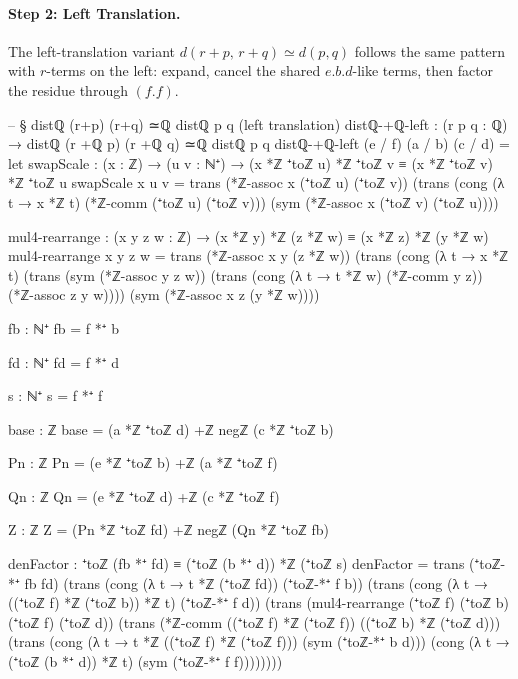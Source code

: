 \documentclass[11pt,a4paper]{book}
\def\cdot{.}%
\begin{document}
\paragraph{Step 2: Left Translation.}
The left-translation variant $d(r+p,\,r+q) \simeq d(p,q)$
follows the same pattern with $r$-terms on the left:
expand, cancel the shared $e \cdot b \cdot d$-like terms, then
factor the residue through $(f \cdot f)$.

\begin{code}
-- § distℚ (r+p) (r+q) ≃ℚ distℚ p q (left translation)
distℚ-+ℚ-left : (r p q : ℚ) → distℚ (r +ℚ p) (r +ℚ q) ≃ℚ distℚ p q
distℚ-+ℚ-left (e / f) (a / b) (c / d) =
  let
    swapScale : (x : ℤ) → (u v : ℕ⁺) → (x *ℤ ⁺toℤ u) *ℤ ⁺toℤ v ≡ (x *ℤ ⁺toℤ v) *ℤ ⁺toℤ u
    swapScale x u v =
      trans
        (*ℤ-assoc x (⁺toℤ u) (⁺toℤ v))
        (trans
          (cong (λ t → x *ℤ t) (*ℤ-comm (⁺toℤ u) (⁺toℤ v)))
          (sym (*ℤ-assoc x (⁺toℤ v) (⁺toℤ u))))

    mul4-rearrange : (x y z w : ℤ) → (x *ℤ y) *ℤ (z *ℤ w) ≡ (x *ℤ z) *ℤ (y *ℤ w)
    mul4-rearrange x y z w =
      trans
        (*ℤ-assoc x y (z *ℤ w))
        (trans
          (cong (λ t → x *ℤ t)
            (trans
              (sym (*ℤ-assoc y z w))
              (trans
                (cong (λ t → t *ℤ w) (*ℤ-comm y z))
                (*ℤ-assoc z y w))))
          (sym (*ℤ-assoc x z (y *ℤ w))))

    fb : ℕ⁺
    fb = f *⁺ b

    fd : ℕ⁺
    fd = f *⁺ d

    s : ℕ⁺
    s = f *⁺ f

    base : ℤ
    base = (a *ℤ ⁺toℤ d) +ℤ negℤ (c *ℤ ⁺toℤ b)

    Pn : ℤ
    Pn = (e *ℤ ⁺toℤ b) +ℤ (a *ℤ ⁺toℤ f)

    Qn : ℤ
    Qn = (e *ℤ ⁺toℤ d) +ℤ (c *ℤ ⁺toℤ f)

    Z : ℤ
    Z = (Pn *ℤ ⁺toℤ fd) +ℤ negℤ (Qn *ℤ ⁺toℤ fb)

    denFactor : ⁺toℤ (fb *⁺ fd) ≡ (⁺toℤ (b *⁺ d)) *ℤ (⁺toℤ s)
    denFactor =
      trans
        (⁺toℤ-*⁺ fb fd)
        (trans
          (cong (λ t → t *ℤ (⁺toℤ fd)) (⁺toℤ-*⁺ f b))
          (trans
            (cong (λ t → ((⁺toℤ f) *ℤ (⁺toℤ b)) *ℤ t) (⁺toℤ-*⁺ f d))
            (trans
              (mul4-rearrange (⁺toℤ f) (⁺toℤ b) (⁺toℤ f) (⁺toℤ d))
              (trans
                (*ℤ-comm ((⁺toℤ f) *ℤ (⁺toℤ f)) ((⁺toℤ b) *ℤ (⁺toℤ d)))
                (trans
                  (cong (λ t → t *ℤ ((⁺toℤ f) *ℤ (⁺toℤ f))) (sym (⁺toℤ-*⁺ b d)))
                  (cong (λ t → (⁺toℤ (b *⁺ d)) *ℤ t) (sym (⁺toℤ-*⁺ f f))))))))


\end{code}
\end{document}
